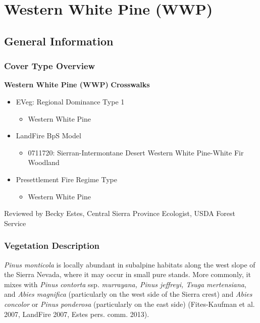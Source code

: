 \newpage
\section{Western White Pine (WWP)}
\label{wwp-description}
\subsection*{General Information}

\subsubsection*{Cover Type Overview}

\textbf{Western White Pine (WWP)}
\newline
\textbf{Crosswalks}
\begin{itemize}
	\item EVeg: Regional Dominance Type 1
	\begin{itemize}
		\item Western White Pine 
	\end{itemize}

	\item LandFire BpS Model
	\begin{itemize}
		\item 0711720: Sierran-Intermontane Desert Western White Pine-White Fir Woodland
	\end{itemize}

	\item Presettlement Fire Regime Type
	\begin{itemize}
		\item Western White Pine
	\end{itemize}
\end{itemize}

\noindent Reviewed by Becky Estes, Central Sierra Province Ecologist, USDA Forest Service

\subsubsection*{Vegetation Description}
\emph{Pinus monticola} is locally abundant in subalpine habitats along the west slope of the Sierra Nevada, where it may occur in small pure stands. More commonly, it mixes with \emph{Pinus contorta} ssp. \emph{murrayana, Pinus jeffreyi, Tsuga mertensiana}, and \emph{Abies magnifica} (particularly on the west side of the Sierra crest) and \emph{Abies concolor} or \emph{Pinus ponderosa} (particularly on the east side) (Fites-Kaufman et al. 2007, LandFire 2007, Estes pers. comm. 2013).

